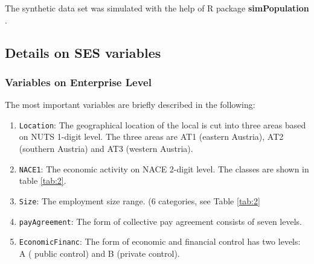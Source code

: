 \documentclass[12pt]{article}
\newcommand{\pkg}[1]{\textbf{#1}}
\newcommand{\proglang}[1]{\textsf{#1}}
\begin{document}
The synthetic data set was simulated with the help of \proglang{R} package \pkg{simPopulation} \citep{alfons11b}. 






\subsection{Details on SES variables} \label{annex:sesvars}

\subsubsection{Variables on Enterprise Level}
The most important variables are briefly described in the following: 
\begin{enumerate}
\item \texttt{Location}: The geographical location of the local is cut into three areas based on NUTS 1-digit level. The three areas are AT1 (eastern Austria), AT2 (southern Austria) and AT3 (western Austria).  
\item \texttt{NACE1}: The economic activity on NACE 2-digit level.  The classes are shown in table \ref{tab:2}. 
\item \texttt{Size}: The employment size range.  (6 categories, see Table \ref{tab:2}
\item \texttt{payAgreement}: The form of collective pay agreement consists of  seven levels.
\item \texttt{EconomicFinanc}: The form of economic and financial control has two levels: A ( public control) and B (private control).  
\end{enumerate}
\end{document}
